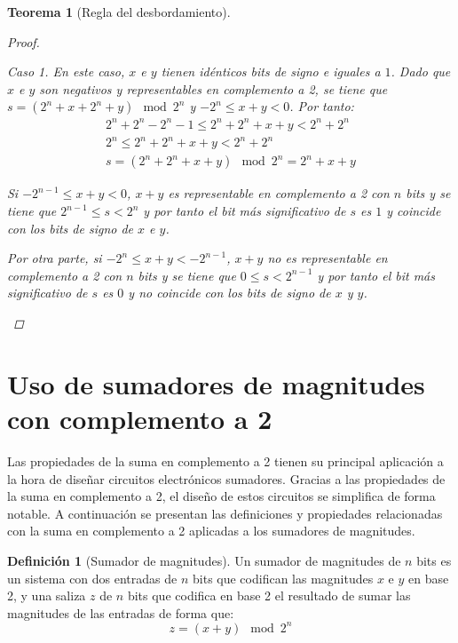 \documentclass[spanish,a4paper,12pt,titlepage]{article}
\newtheorem{theorem}{Teorema}%
\theoremstyle{definition}
\newtheorem{definition}{Definición}%
\theoremstyle{remark}
\newtheorem{case}{Caso}
\begin{document}
\begin{theorem}[Regla del desbordamiento]
\begin{proof}
\begin{case}
      En este caso, $x$ e $y$ tienen idénticos bits de signo e iguales a $1$. Dado que $x$ e $y$ son negativos y representables en complemento a 2, se tiene que $s = (2^n + x + 2^n + y) \mod 2^n$ y $-2^n \le x+y < 0$. Por tanto:
      \begin{align*}
        2^n + 2^n - 2^n-1 \le 2^n + 2^n + x + y < 2^n + 2^n\\
        2^n \le 2^n + 2^n + x + y < 2^n + 2^n\\
        s = (2^n + 2^n + x + y) \mod 2^n = 2^n + x + y
      \end{align*}

      Si $-2^{n-1} \le x+y < 0$, $x+y$ es representable en complemento a 2 con $n$ bits y se tiene que $2^{n-1} \le s < 2^n$ y por tanto el bit más significativo de $s$ es $1$ y coincide con los bits de signo de $x$ e $y$.

      Por otra parte, si $-2^n \le x+y < -2^{n-1}$, $x+y$ no es representable en complemento a 2 con $n$ bits y se tiene que $0 \le s < 2^{n-1}$ y por tanto el bit más significativo de $s$ es $0$ y no coincide con los bits de signo de $x$ y $y$.
    \end{case}
  \end{proof}
\end{theorem}

\section{Uso de sumadores de magnitudes con complemento a 2}

Las propiedades de la suma en complemento a 2 tienen su principal aplicación a la hora de diseñar circuitos electrónicos sumadores. Gracias a las propiedades de la suma en complemento a 2, el diseño de estos circuitos se simplifica de forma notable. A continuación se presentan las definiciones y propiedades relacionadas con la suma en complemento a 2 aplicadas a los sumadores de magnitudes.

\begin{definition}[Sumador de magnitudes]
  Un sumador de magnitudes de $n$ bits es un sistema con dos entradas de $n$ bits que codifican las magnitudes $x$ e $y$ en base 2, y una saliza $z$ de $n$ bits que codifica en base 2 el resultado de sumar las magnitudes de las entradas de forma que:
  \[
    z = (x + y) \mod 2^n
  \]
\end{definition}
\end{document}
